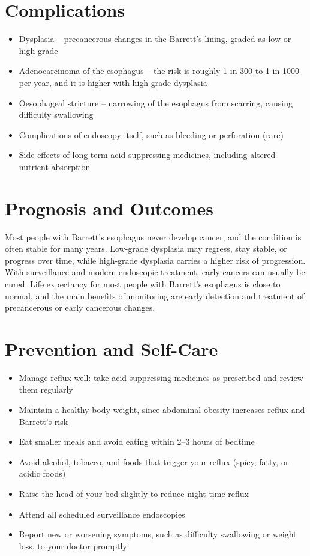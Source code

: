\section*{Complications}
\begin{itemize}
    \item Dysplasia -- precancerous changes in the Barrett's lining, graded as low or high grade
    \item Adenocarcinoma of the esophagus -- the risk is roughly 1 in 300 to 1 in 1000 per year, and it is higher with high-grade dysplasia
    \item Oesophageal stricture -- narrowing of the esophagus from scarring, causing difficulty swallowing
    \item Complications of endoscopy itself, such as bleeding or perforation (rare)
    \item Side effects of long-term acid-suppressing medicines, including altered nutrient absorption
\end{itemize}

\section*{Prognosis and Outcomes}
Most people with Barrett's esophagus never develop cancer, and the condition is often stable for many years. Low-grade dysplasia may regress, stay stable, or progress over time, while high-grade dysplasia carries a higher risk of progression. With surveillance and modern endoscopic treatment, early cancers can usually be cured. Life expectancy for most people with Barrett's esophagus is close to normal, and the main benefits of monitoring are early detection and treatment of precancerous or early cancerous changes.

\section*{Prevention and Self-Care}
\begin{itemize}
    \item Manage reflux well: take acid-suppressing medicines as prescribed and review them regularly
    \item Maintain a healthy body weight, since abdominal obesity increases reflux and Barrett's risk
    \item Eat smaller meals and avoid eating within 2--3 hours of bedtime
    \item Avoid alcohol, tobacco, and foods that trigger your reflux (spicy, fatty, or acidic foods)
    \item Raise the head of your bed slightly to reduce night-time reflux
    \item Attend all scheduled surveillance endoscopies
    \item Report new or worsening symptoms, such as difficulty swallowing or weight loss, to your doctor promptly
\end{itemize}

